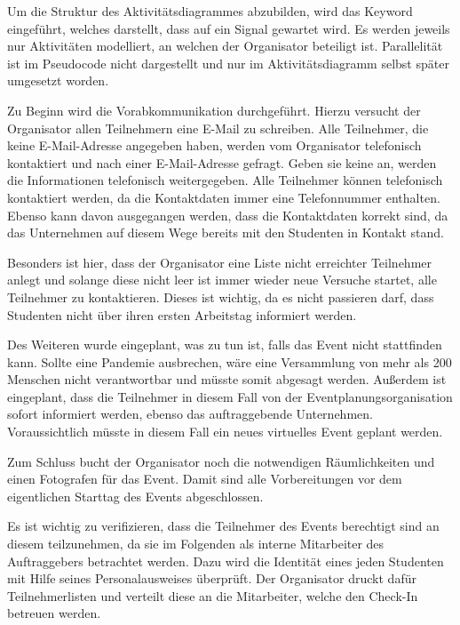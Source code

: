 Um die Struktur des Aktivitätsdiagrammes abzubilden, wird das Keyword  eingeführt, welches darstellt, dass auf ein Signal gewartet wird. Es werden jeweils nur Aktivitäten modelliert, an welchen der Organisator beteiligt ist. Parallelität ist im Pseudocode nicht dargestellt und nur im Aktivitätsdiagramm selbst später umgesetzt worden.

Zu Beginn wird die Vorabkommunikation durchgeführt. Hierzu versucht der Organisator allen Teilnehmern eine E-Mail zu schreiben. Alle Teilnehmer, die keine E-Mail-Adresse angegeben haben, werden vom Organisator telefonisch kontaktiert und nach einer E-Mail-Adresse gefragt. Geben sie keine an, werden die Informationen telefonisch weitergegeben. Alle Teilnehmer können telefonisch kontaktiert werden, da die Kontaktdaten immer eine Telefonnummer enthalten. Ebenso kann davon ausgegangen werden, dass die Kontaktdaten korrekt sind, da das Unternehmen auf diesem Wege bereits mit den Studenten in Kontakt stand.

Besonders ist hier, dass der Organisator eine Liste nicht erreichter Teilnehmer anlegt und solange diese nicht leer ist immer wieder neue Versuche startet, alle Teilnehmer zu kontaktieren. Dieses ist wichtig, da es nicht passieren darf, dass Studenten nicht über ihren ersten Arbeitstag informiert werden.

Des Weiteren wurde eingeplant, was zu tun ist, falls das Event nicht stattfinden kann. Sollte eine Pandemie ausbrechen, wäre eine Versammlung von mehr als 200 Menschen nicht verantwortbar und müsste somit abgesagt werden. Außerdem ist eingeplant, dass die Teilnehmer in diesem Fall von der Eventplanungsorganisation sofort informiert werden, ebenso das auftraggebende Unternehmen. Voraussichtlich müsste in diesem Fall ein neues virtuelles Event geplant werden.

Zum Schluss bucht der Organisator noch die notwendigen Räumlichkeiten und einen Fotografen für das Event. Damit sind alle Vorbereitungen vor dem eigentlichen Starttag des Events abgeschlossen.


Es ist wichtig zu verifizieren, dass die Teilnehmer des Events berechtigt sind an diesem teilzunehmen, da sie im Folgenden als interne Mitarbeiter des Auftraggebers betrachtet werden. Dazu wird die Identität eines jeden Studenten mit Hilfe seines Personalausweises überprüft. Der Organisator druckt dafür Teilnehmerlisten und verteilt diese an die Mitarbeiter, welche den Check-In betreuen werden.

